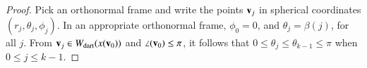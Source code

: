 \begin{proof}  
%
%
%
Pick an orthonormal frame and write the points ${\mathbf v}_j$ in spherical coordinates $(r_j,\theta_j,\phi_j)$.  In an appropriate orthonormal frame, $\phi_0=0$, and $\theta_j=\beta(j)$, for all $j$.  From ${\mathbf v}_j\in W_{\text{dart}}(x({\mathbf v}_0))$ and $\angle({\mathbf v}_0)\le\pi$, it follows that $0\le\theta_j\le\theta_{k-1}\le\pi$ when $0\le j\le k-1$.


\end{proof}
